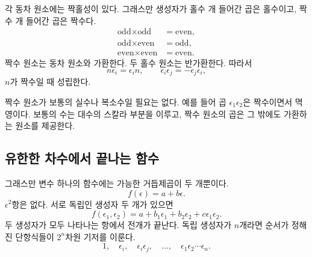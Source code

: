 각 동차 원소에는 짝홀성이 있다. 그래스만 생성자가 홀수 개 들어간 곱은 홀수이고, 짝수 개 들어간 곱은 짝수다.
\begin{align}
\text{odd}\times\text{odd}&=\text{even},\\
\text{odd}\times\text{even}&=\text{odd},\\
\text{even}\times\text{even}&=\text{even}.
\end{align}
짝수 원소는 동차 원소와 가환한다. 두 홀수 원소는 반가환한다. 따라서
\begin{equation}
n\epsilon_i=\epsilon_i n,
\qquad
\epsilon_i\epsilon_j=-\epsilon_j\epsilon_i,
\end{equation}
\(n\)가 짝수일 때 성립한다.

짝수 원소가 보통의 실수나 복소수일 필요는 없다. 예를 들어 곱 \(\epsilon_1\epsilon_2\)은 짝수이면서 멱영이다. 보통의 수는 대수의 스칼라 부분을 이루고, 짝수 원소의 곱은 그 밖에도 가환하는 원소를 제공한다.

\begin{classroomqa}
\end{classroomqa}

\subsection{유한한 차수에서 끝나는 함수}

그래스만 변수 하나의 함수에는 가능한 거듭제곱이 두 개뿐이다.
\begin{equation}
f(\epsilon)=a+b\epsilon.
\end{equation}
\(\epsilon^2\)항은 없다. 서로 독립인 생성자 두 개가 있으면
\begin{equation}
f(\epsilon_1,\epsilon_2)
=a+b_1\epsilon_1+b_2\epsilon_2+c\epsilon_1\epsilon_2.
\end{equation}
두 생성자가 모두 나타나는 항에서 전개가 끝난다. 독립 생성자가 \(n\)개라면 순서가 정해진 단항식들이 \(2^n\)차원 기저를 이룬다.
\begin{equation}
1,\quad
\epsilon_i,\quad
\epsilon_i\epsilon_j,\quad
\ldots,\quad
\epsilon_1\epsilon_2\cdots\epsilon_n.
\end{equation}

